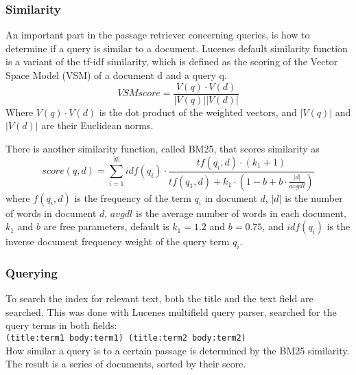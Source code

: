 \subsubsection{Similarity}
An important part in the passage retriever concerning queries, is how to determine if a query is similar to a document.
Lucenes default similarity function is a variant of the tf-idf similarity, 
which is defined as the scoring of the Vector Space Model (VSM) of a document d and a query q.
\[VSM score = \frac{V(q)\cdot V(d)}{|V(q)||V(d)|} \]
Where $V(q) \cdot V(d)$ is the dot product of the weighted vectors, and $|V(q)|$ and $|V(d)|$ are their Euclidean norms.\cite{tfidfsimilarity}

There is another similarity function, called BM25, that scores similarity as
\[ score(q,d) = \sum_{i=1}^{|q|} idf(q_i) \cdot \frac{tf(q_i,d) \cdot (k_1 + 1)}{tf(q_1,d) + k_1 \cdot (1 - b + b \cdot \frac{|d|}{avgdl})} \]
where $f(q_i,d)$ is the frequency of the term $q_i$ in document $d$, 
$|d|$ is the number of words in document $d$,
$avgdl$ is the average number of words in each document,
$k_1$ and $b$ are free parameters, default is $k_1 = 1.2$ and $b = 0.75$,
and $idf(q_i)$ is the inverse document frequency weight of the query term $q_i$.\cite{bm25similarity}

\subsubsection{Querying}
To search the index for relevant text, both the title and the text field are searched. 
This was done with Lucenes multifield query parser, searched for the query terms in both fields: \\
\texttt{(title:term1 body:term1) (title:term2 body:term2)} \\
How similar a query is to a certain passage is determined by the BM25 similarity.
The result is a series of documents, sorted by their score.
